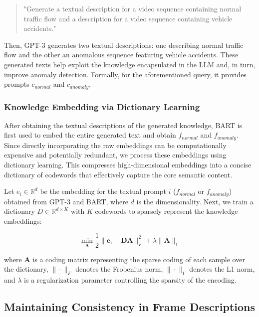 \begin{quote}
"Generate a textual description for a video sequence containing normal traffic flow and a description for a video sequence containing vehicle accidents."
\end{quote}

Then, GPT-3 generates two textual descriptions: one describing normal traffic flow and the other an anomalous sequence featuring vehicle accidents. These generated texts help exploit the knowledge encapsulated in the LLM and, in turn, improve anomaly detection. Formally, for the aforementioned query, it provides prompts $c_{normal}$ and $c_{anomaly}$.

\subsubsection{Knowledge Embedding via Dictionary Learning}

After obtaining the textual descriptions of the generated knowledge, BART\citep{a-lewis2019bart} is first used to embed the entire generated text and obtain $f_{normal}$ and $f_{anomaly}$. Since directly incorporating the raw embeddings can be computationally expensive and potentially redundant, we process these embeddings using dictionary learning. This compresses high-dimensional embeddings into a concise dictionary of codewords that effectively capture the core semantic content.

Let $e_i \in \mathbb{R}^d$ be the embedding for the textual prompt $i$ ($f_{normal}$ or $f_{anomaly}$) obtained from GPT-3 and BART, where $d$ is the dimensionality. Next, we train a dictionary $D \in \mathbb{R}^{d \times K}$ with $K$ codewords to sparsely represent the knowledge embeddings:

\begin{equation}
\min_{\mathbf{A}} \frac{1}{2} \| \mathbf{e_{i}} - \mathbf{D} \mathbf{A} \|_F^2 + \lambda \| \mathbf{A} \|_1
\end{equation}

where $\mathbf{A}$ is a coding matrix representing the sparse coding of each sample over the dictionary, $\| \cdot \|_F$ denotes the Frobenius norm, $\| \cdot \|_1$ denotes the L1 norm, and $\lambda$ is a regularization parameter controlling the sparsity of the encoding.

\subsection{Maintaining Consistency in Frame Descriptions \label{sec:maintain}}

